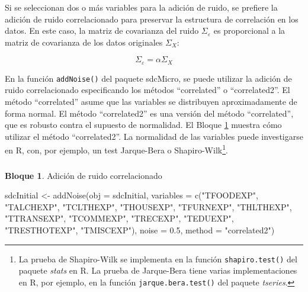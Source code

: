 \documentclass[
]{book}
\newenvironment{Shaded}{\begin{snugshade}}{\end{snugshade}}
\newcommand{\AttributeTok}[1]{\textcolor[rgb]{0.77,0.63,0.00}{#1}}
\newcommand{\FloatTok}[1]{\textcolor[rgb]{0.00,0.00,0.81}{#1}}
\newcommand{\FunctionTok}[1]{\textcolor[rgb]{0.00,0.00,0.00}{#1}}
\newcommand{\NormalTok}[1]{#1}
\newcommand{\OtherTok}[1]{\textcolor[rgb]{0.56,0.35,0.01}{#1}}
\newcommand{\StringTok}[1]{\textcolor[rgb]{0.31,0.60,0.02}{#1}}
\theoremstyle{definition}
\theoremstyle{definition}
\newtheorem{example}{Bloque}[chapter]
\theoremstyle{definition}
\theoremstyle{definition}
\theoremstyle{remark}
\begin{document}
Si se seleccionan dos o más variables para la adición de ruido, se prefiere la adición de ruido correlacionado para preservar la estructura de correlación en los datos. En este caso, la matriz de covarianza del ruido \(\Sigma_{\varepsilon}\) es proporcional a la matriz de covarianza de los datos originales \(\Sigma_{X}\):

\[\Sigma_{\varepsilon} = \alpha \Sigma_{X}\]

En la función \texttt{addNoise()} del paquete sdcMicro, se puede utilizar la adición de ruido correlacionado especificando los métodos ``correlated'' o ``correlated2''. El método ``correlated'' asume que las variables se distribuyen aproximadamente de forma normal. El método ``correlated2'' es una versión del método ``correlated'', que es robusto contra el supuesto de normalidad. El Bloque \ref{exm:bloque34jgm} muestra cómo utilizar el método ``correlated2''. La normalidad de las variables puede investigarse en R, con, por ejemplo, un test Jarque-Bera o Shapiro-Wilk\footnote{La prueba de Shapiro-Wilk se implementa en la función \texttt{shapiro.test()} del paquete \emph{stats} en R. La prueba de Jarque-Bera tiene varias implementaciones en R, por ejemplo, en la función \texttt{jarque.bera.test()} del paquete \emph{tseries}.}.

\hypertarget{section-8}{%
\subsubsection{}\label{section-8}}

\begin{example}
\protect\hypertarget{exm:bloque34jgm}{}\label{exm:bloque34jgm}Adición de ruido correlacionado
\end{example}

\begin{Shaded}
\begin{Highlighting}[]
\NormalTok{sdcInitial }\OtherTok{\textless{}{-}} \FunctionTok{addNoise}\NormalTok{(}\AttributeTok{obj =}\NormalTok{ sdcInitial, }\AttributeTok{variables =} \FunctionTok{c}\NormalTok{(}\StringTok{"TFOODEXP"}\NormalTok{, }\StringTok{"TALCHEXP"}\NormalTok{, }\StringTok{"TCLTHEXP"}\NormalTok{, }\StringTok{"THOUSEXP"}\NormalTok{, }
                                                       \StringTok{"TFURNEXP"}\NormalTok{, }\StringTok{"THLTHEXP"}\NormalTok{, }\StringTok{"TTRANSEXP"}\NormalTok{, }\StringTok{"TCOMMEXP"}\NormalTok{, }
                                                       \StringTok{"TRECEXP"}\NormalTok{, }\StringTok{"TEDUEXP"}\NormalTok{, }\StringTok{"TRESTHOTEXP"}\NormalTok{, }\StringTok{"TMISCEXP"}\NormalTok{), }
                       \AttributeTok{noise =} \FloatTok{0.5}\NormalTok{, }\AttributeTok{method =} \StringTok{"correlated2"}\NormalTok{)}
\end{Highlighting}
\end{Shaded}
\end{document}
